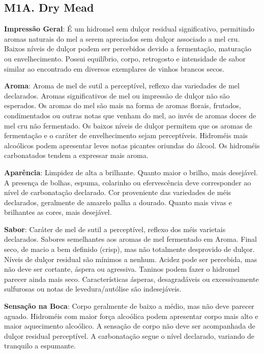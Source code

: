 \subsection*{M1A. Dry Mead}

\textbf{Impressão Geral}: É um hidromel sem dulçor residual significativo, permitindo aromas naturais do mel a serem apreciados sem dulçor associado a mel cru. Baixos níveis de dulçor podem ser percebidos devido a fermentação, maturação ou envelhecimento. Possui equilíbrio, corpo, retrogosto e intensidade de sabor similar ao encontrado em diversos exemplares de vinhos brancos secos.

\textbf{Aroma}: Aroma de mel de sutil a perceptível, reflexo das variedades de mel declarados. Aromas significativos de mel ou impressão de dulçor não são esperados. Os aromas do mel são mais na forma de aromas florais, frutados, condimentados ou outras notas que venham do mel, ao invés de aromas doces de mel cru não fermentado. Os baixos níveis de dulçor permitem que os aromas de fermentação e o caráter de envelhecimento sejam perceptíveis. Hidroméis mais alcoólicos podem apresentar leves notas picantes oriundas do álcool. Os hidroméis carbonatados tendem a expressar mais aroma.

\textbf{Aparência}: Limpidez de alta a brilhante. Quanto maior o brilho, mais desejável. A presença de bolhas, espuma, colarinho ou efervescência deve corresponder ao nível de carbonatação declarado. Cor proveniente das variedades de méis declarados, geralmente de amarelo palha a dourado. Quanto mais vivas e brilhantes as cores, mais desejável.

\textbf{Sabor}: Caráter de mel de sutil a perceptível, reflexo dos méis varietais declarados. Sabores semelhantes aos aromas de mel fermentado em Aroma. Final seco, de macio a bem definido (crisp), mas não totalmente desprovido de dulçor. Níveis de dulçor residual são mínimos a nenhum. Acidez pode ser percebida, mas não deve ser cortante, áspera ou agressiva. Taninos podem fazer o hidromel parecer ainda mais seco. Características ásperas, desagradáveis ou excessivamente sulfurosas ou notas de levedura/autólise são indesejáveis.

\textbf{Sensação na Boca}: Corpo geralmente de baixo a médio, mas não deve parecer aguado. Hidroméis com maior força alcoólica podem apresentar corpo mais alto e maior aquecimento alcoólico. A sensação de corpo não deve ser acompanhada de dulçor residual perceptível. A carbonatação segue o nível declarado, variando de tranquilo a espumante.

